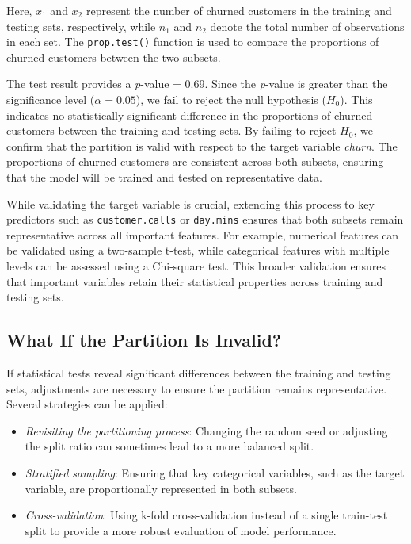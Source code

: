 \documentclass[
  11pt,
]{book}
\providecommand{\tightlist}{%
  \setlength{\itemsep}{0pt}\setlength{\parskip}{0pt}}
\theoremstyle{definition}
\theoremstyle{definition}
\theoremstyle{definition}
\theoremstyle{definition}
\theoremstyle{remark}
\begin{document}
Here, \(x_1\) and \(x_2\) represent the number of churned customers in the training and testing sets, respectively, while \(n_1\) and \(n_2\) denote the total number of observations in each set. The \texttt{prop.test()} function is used to compare the proportions of churned customers between the two subsets.

The test result provides a \emph{p}-value = 0.69. Since the \emph{p}-value is greater than the significance level (\(\alpha = 0.05\)), we fail to reject the null hypothesis (\(H_0\)). This indicates no statistically significant difference in the proportions of churned customers between the training and testing sets. By failing to reject \(H_0\), we confirm that the partition is valid with respect to the target variable \emph{churn}. The proportions of churned customers are consistent across both subsets, ensuring that the model will be trained and tested on representative data.

While validating the target variable is crucial, extending this process to key predictors such as \texttt{customer.calls} or \texttt{day.mins} ensures that both subsets remain representative across all important features. For example, numerical features can be validated using a two-sample t-test, while categorical features with multiple levels can be assessed using a Chi-square test. This broader validation ensures that important variables retain their statistical properties across training and testing sets.

\subsection*{What If the Partition Is Invalid?}\label{what-if-the-partition-is-invalid}


If statistical tests reveal significant differences between the training and testing sets, adjustments are necessary to ensure the partition remains representative. Several strategies can be applied:

\begin{itemize}
\tightlist
\item
  \emph{Revisiting the partitioning process}: Changing the random seed or adjusting the split ratio can sometimes lead to a more balanced split.
\item
  \emph{Stratified sampling}: Ensuring that key categorical variables, such as the target variable, are proportionally represented in both subsets.
\item
  \emph{Cross-validation}: Using k-fold cross-validation instead of a single train-test split to provide a more robust evaluation of model performance.
\end{itemize}
\end{document}
